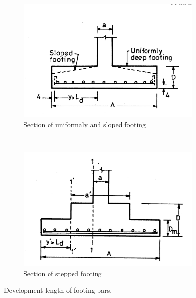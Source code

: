 \documentclass{report}
\begin{document}
\begin{figure}
  \centering
  \begin{subfigure}[b]{0.5\textwidth}
    \includegraphics[width=\textwidth]{images/fig2341.png}
    \caption{Section of uniformaly and sloped footing}
    \label{uniformallydeepfooting}
  \end{subfigure}\\
  \begin{subfigure}[b]{0.5\textwidth}
    \includegraphics[width=\textwidth]{images/fig2342.png}
    \caption{Section of stepped footing}
    \label{stepedfoting}
  \end{subfigure}
\caption{Development length of footing bars.}
\end{figure}

\end{document}
